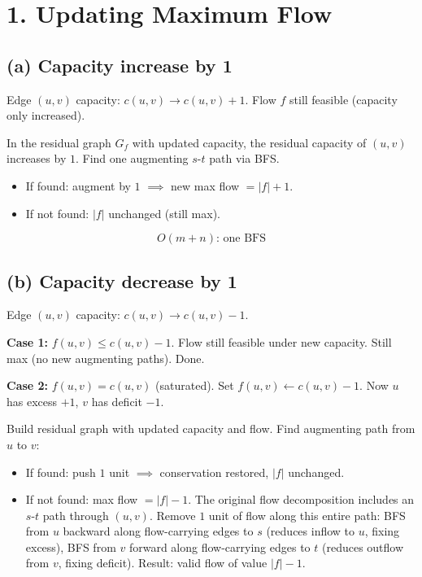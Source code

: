 \documentclass[11pt]{article}
\begin{document}
\section*{1. Updating Maximum Flow}

\vspace{-10pt}
\subsection*{(a) Capacity increase by 1}

Edge $(u,v)$ capacity: $c(u,v) \to c(u,v) + 1$. Flow $f$ still feasible (capacity only increased).

In the residual graph $G_f$ with updated capacity, the residual capacity of $(u,v)$ increases by $1$. Find one augmenting $s$-$t$ path via BFS.
\begin{itemize}[leftmargin=*,itemsep=2pt]
\item If found: augment by $1$ $\implies$ new max flow $= |f| + 1$.
\item If not found: $|f|$ unchanged (still max).
\end{itemize}

\[\boxed{O(m + n) \text{: one BFS}}\]

\vspace{-20pt}
\subsection*{(b) Capacity decrease by 1}

Edge $(u,v)$ capacity: $c(u,v) \to c(u,v) - 1$.

\textbf{Case 1:} $f(u,v) \le c(u,v) - 1$. Flow still feasible under new capacity. Still max (no new augmenting paths). Done.

\textbf{Case 2:} $f(u,v) = c(u,v)$ (saturated). Set $f(u,v) \leftarrow c(u,v) - 1$. Now $u$ has excess $+1$, $v$ has deficit $-1$.

Build residual graph with updated capacity and flow. Find augmenting path from $u$ to $v$:
\begin{itemize}[leftmargin=*,itemsep=2pt]
\item If found: push $1$ unit $\implies$ conservation restored, $|f|$ unchanged.
\item If not found: max flow $= |f| - 1$. The original flow decomposition includes an $s$-$t$ path through $(u,v)$. Remove $1$ unit of flow along this entire path: BFS from $u$ backward along flow-carrying edges to $s$ (reduces inflow to $u$, fixing excess), BFS from $v$ forward along flow-carrying edges to $t$ (reduces outflow from $v$, fixing deficit). Result: valid flow of value $|f| - 1$.
\end{itemize}
\end{document}
